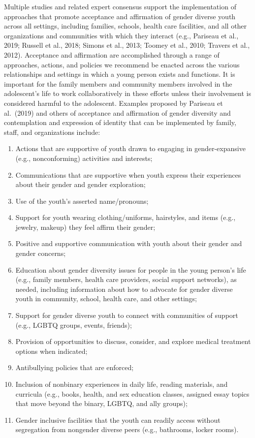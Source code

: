 \documentclass[
]{book}
\providecommand{\tightlist}{%
  \setlength{\itemsep}{0pt}\setlength{\parskip}{0pt}}
\begin{document}
Multiple studies and related expert consensus
support the implementation of approaches that
promote acceptance and affirmation of gender
diverse youth across all settings, including families, schools, health care facilities, and all other
organizations and communities with which they
interact (e.g., Pariseau et al., 2019; Russell et al.,
2018; Simons et al., 2013; Toomey et al., 2010;
Travers et al., 2012). Acceptance and affirmation
are accomplished through a range of approaches,
actions, and policies we recommend be enacted
across the various relationships and settings in
which a young person exists and functions. It is
important for the family members and community members involved in the adolescent's life to
work collaboratively in these efforts unless their
involvement is considered harmful to the adolescent. Examples proposed by Pariseau et al.~(2019)
and others of acceptance and affirmation of gender diversity and contemplation and expression
of identity that can be implemented by family,
staff, and organizations include:

\begin{enumerate}
\def\labelenumi{\arabic{enumi}.}
\tightlist
\item
  Actions that are supportive of youth drawn to engaging in gender-expansive (e.g., nonconforming) activities and interests;
\item
  Communications that are supportive when youth express their experiences about their gender and gender exploration;
\item
  Use of the youth's asserted name/pronouns;
\item
  Support for youth wearing clothing/uniforms, hairstyles, and items (e.g., jewelry, makeup) they feel affirm their gender;
\item
  Positive and supportive communication with youth about their gender and gender concerns;
\item
  Education about gender diversity issues for people in the young person's life (e.g., family members, health care providers, social support networks), as needed, including information about how to advocate for gender diverse youth in community, school, health care, and other settings;
\item
  Support for gender diverse youth to connect with communities of support (e.g., LGBTQ groups, events, friends);
\item
  Provision of opportunities to discuss, consider, and explore medical treatment options when indicated;
\item
  Antibullying policies that are enforced;
\item
  Inclusion of nonbinary experiences in daily life, reading materials, and curricula (e.g., books, health, and sex education classes, assigned essay topics that move beyond the binary, LGBTQ, and ally groups);
\item
  Gender inclusive facilities that the youth can readily access without segregation from nongender diverse peers (e.g., bathrooms, locker rooms).
\end{enumerate}
\end{document}
